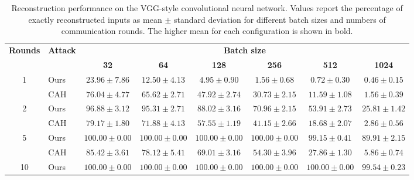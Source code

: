 \begin{table}[t]
    \centering
    \footnotesize
    \setlength{\tabcolsep}{2pt}
    \renewcommand{\arraystretch}{1.08}
    \caption{Reconstruction performance on the VGG-style convolutional neural network. Values report the percentage of exactly reconstructed inputs as mean $\pm$ standard deviation for different batch sizes and numbers of communication rounds. The higher mean for each configuration is shown in bold.}
    \label{tab:cnn_effect}
    \begin{tabular}{@{}clcccccc@{}}
        \toprule
        \textbf{Rounds} & \textbf{Attack}
        & \multicolumn{6}{c}{\textbf{Batch size}} \\
        \cmidrule(l){3-8}
        & & \textbf{32} & \textbf{64} & \textbf{128}
          & \textbf{256} & \textbf{512} & \textbf{1024} \\
        \midrule
        \multirow{2}{*}{1}
        & Ours & $23.96 \pm 7.86$ & $12.50 \pm 4.13$ & $4.95 \pm 0.90$
               & $1.56 \pm 0.68$ & $0.72 \pm 0.30$ & $0.46 \pm 0.15$ \\
        & CAH  & $\mathbf{76.04} \pm 4.77$ & $\mathbf{65.62} \pm 2.71$ & $\mathbf{47.92} \pm 2.74$
               & $\mathbf{30.73} \pm 2.15$ & $\mathbf{11.59} \pm 1.08$ & $\mathbf{1.56} \pm 0.39$ \\
        \midrule
        \multirow{2}{*}{2}
        & Ours & $\mathbf{96.88} \pm 3.12$ & $\mathbf{95.31} \pm 2.71$ & $\mathbf{88.02} \pm 3.16$
               & $\mathbf{70.96} \pm 2.15$ & $\mathbf{53.91} \pm 2.73$ & $\mathbf{25.81} \pm 1.42$ \\
        & CAH  & $79.17 \pm 1.80$ & $71.88 \pm 4.13$ & $57.55 \pm 1.19$
               & $41.15 \pm 2.66$ & $18.68 \pm 2.07$ & $2.86 \pm 0.56$ \\
        \midrule
        \multirow{2}{*}{5}
        & Ours & $\mathbf{100.00} \pm 0.00$ & $\mathbf{100.00} \pm 0.00$ & $\mathbf{100.00} \pm 0.00$
               & $\mathbf{100.00} \pm 0.00$ & $\mathbf{99.15} \pm 0.41$ & $\mathbf{89.91} \pm 2.15$ \\
        & CAH  & $85.42 \pm 3.61$ & $78.12 \pm 5.41$ & $69.01 \pm 3.16$
               & $54.30 \pm 3.96$ & $27.86 \pm 1.30$ & $5.86 \pm 0.74$ \\
        \midrule
        \multirow{2}{*}{10}
        & Ours & $\mathbf{100.00} \pm 0.00$ & $\mathbf{100.00} \pm 0.00$ & $\mathbf{100.00} \pm 0.00$
               & $\mathbf{100.00} \pm 0.00$ & $\mathbf{100.00} \pm 0.00$ & $\mathbf{99.54} \pm 0.23$ \\

\end{tabular}
\end{table}

